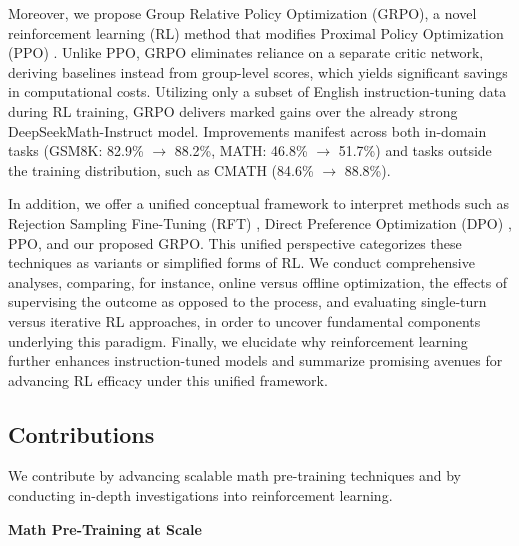 Moreover, we propose Group Relative Policy Optimization (GRPO), a novel reinforcement learning (RL) method that modifies Proximal Policy Optimization (PPO) \citep{schulman2017proximal}. Unlike PPO, GRPO eliminates reliance on a separate critic network, deriving baselines instead from group-level scores, which yields significant savings in computational costs. Utilizing only a subset of English instruction-tuning data during RL training, GRPO delivers marked gains over the already strong DeepSeekMath-Instruct model. Improvements manifest across both in-domain tasks (GSM8K: 82.9\% $\rightarrow$ 88.2\%, MATH: 46.8\% $\rightarrow$ 51.7\%) and tasks outside the training distribution, such as CMATH (84.6\% $\rightarrow$ 88.8\%).

In addition, we offer a unified conceptual framework to interpret methods such as Rejection Sampling Fine-Tuning (RFT) \citep{yuan2023scaling}, Direct Preference Optimization (DPO) \citep{dpo}, PPO, and our proposed GRPO. This unified perspective categorizes these techniques as variants or simplified forms of RL. We conduct comprehensive analyses, comparing, for instance, online versus offline optimization, the effects of supervising the outcome as opposed to the process, and evaluating single-turn versus iterative RL approaches, in order to uncover fundamental components underlying this paradigm. Finally, we elucidate why reinforcement learning further enhances instruction-tuned models and summarize promising avenues for advancing RL efficacy under this unified framework.

\subsection{Contributions}
We contribute by advancing scalable math pre-training techniques and by conducting in-depth investigations into reinforcement learning.

\textbf{Math Pre-Training at Scale}

